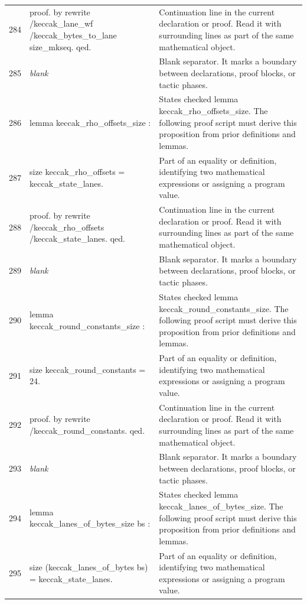\documentclass[10pt]{article}
\begin{document}
\begin{longtable}{r L{0.53\textwidth} L{0.37\textwidth}}
284 & {\ttfamily\scriptsize proof. by rewrite /keccak\_lane\_wf /keccak\_bytes\_to\_lane size\_mkseq. qed.} & Continuation line in the current declaration or proof.  Read it with surrounding lines as part of the same mathematical object. \\
285 & {\ttfamily\scriptsize \emph{blank}} & Blank separator.  It marks a boundary between declarations, proof blocks, or tactic phases. \\
286 & {\ttfamily\scriptsize lemma keccak\_rho\_offsets\_size :} & States checked lemma keccak\_rho\_offsets\_size.  The following proof script must derive this proposition from prior definitions and lemmas. \\
287 & {\ttfamily\scriptsize   size keccak\_rho\_offsets = keccak\_state\_lanes.} & Part of an equality or definition, identifying two mathematical expressions or assigning a program value. \\
288 & {\ttfamily\scriptsize proof. by rewrite /keccak\_rho\_offsets /keccak\_state\_lanes. qed.} & Continuation line in the current declaration or proof.  Read it with surrounding lines as part of the same mathematical object. \\
289 & {\ttfamily\scriptsize \emph{blank}} & Blank separator.  It marks a boundary between declarations, proof blocks, or tactic phases. \\
290 & {\ttfamily\scriptsize lemma keccak\_round\_constants\_size :} & States checked lemma keccak\_round\_constants\_size.  The following proof script must derive this proposition from prior definitions and lemmas. \\
291 & {\ttfamily\scriptsize   size keccak\_round\_constants = 24.} & Part of an equality or definition, identifying two mathematical expressions or assigning a program value. \\
292 & {\ttfamily\scriptsize proof. by rewrite /keccak\_round\_constants. qed.} & Continuation line in the current declaration or proof.  Read it with surrounding lines as part of the same mathematical object. \\
293 & {\ttfamily\scriptsize \emph{blank}} & Blank separator.  It marks a boundary between declarations, proof blocks, or tactic phases. \\
294 & {\ttfamily\scriptsize lemma keccak\_lanes\_of\_bytes\_size bs :} & States checked lemma keccak\_lanes\_of\_bytes\_size.  The following proof script must derive this proposition from prior definitions and lemmas. \\
295 & {\ttfamily\scriptsize   size (keccak\_lanes\_of\_bytes bs) = keccak\_state\_lanes.} & Part of an equality or definition, identifying two mathematical expressions or assigning a program value. \\

\end{longtable}
\end{document}
